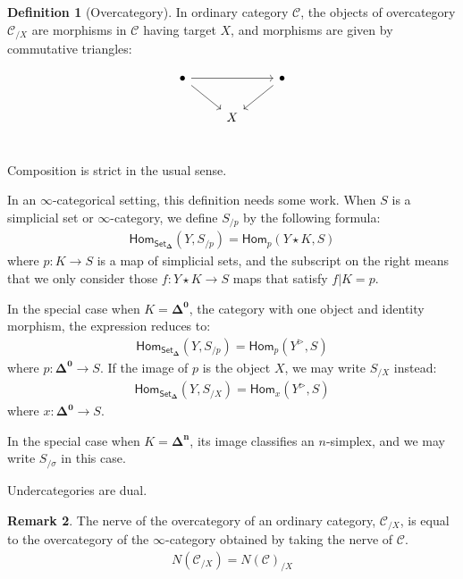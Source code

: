 \documentclass[10pt]{amsart}
\newcommand{\8}{\ensuremath{\infty}}
\newcommand{\0}{\ensuremath{\overset{\rightarrow}{0}}}
\newcommand{\1}{\ensuremath{\mathbf{1}}}
\newcommand{\C}{\ensuremath{\mathscr{C}}}
\newcommand{\Hom}{\ensuremath{\mathsf{Hom}}}
\newcommand{\Simplex}[1]{\ensuremath{\boldsymbol{\Delta^{#1}}}}
\newcommand{\SSet}{\ensuremath{\mathsf{Set}_{\boldsymbol{\Delta}}}}
\theoremstyle{definition}
\newtheorem{definition}{Definition}[section]
\newtheorem{remark}[definition]{Remark}
\numberwithin{definition}{subsection}
\numberwithin{definition}{section}
\begin{document}
\begin{definition}[Overcategory]
  In ordinary category \C, the objects of overcategory $\C_{/X}$ are morphisms in $\C$ having target $X$, and morphisms are given by commutative triangles:

  \begin{equation*}
    \begin{tikzcd}
      \bullet \arrow[rr] \arrow[dr] & & \bullet \arrow[dl] \\
      & X & \\
    \end{tikzcd}
  \end{equation*}

  Composition is strict in the usual sense.

  In an \8-categorical setting, this definition needs some work. When $S$ is a simplicial set or \8-category, we define $S_{/p}$ by the following formula:
  \begin{align*}
    \Hom_{\SSet}(Y, S_{/p}) = \Hom_p(Y \star K, S)
  \end{align*}
  where $p : K \rightarrow S$ is a map of simplicial sets, and the subscript on the right means that we only consider those $f : Y \star K \rightarrow S$ maps that satisfy $f|K = p$.

  In the special case when $K = \Simplex{0}$, the category with one object and identity morphism, the expression reduces to:
  \begin{align*}
    \Hom_{\SSet}(Y, S_{/p}) = \Hom_p(Y^\triangleright, S)
  \end{align*}
  where $p : \Simplex{0} \rightarrow S$. If the image of $p$ is the object $X$, we may write $S_{/X}$ instead:
  \begin{align*}
    \Hom_{\SSet}(Y, S_{/X}) = \Hom_x(Y^\triangleright, S)
  \end{align*}
  where $x : \Simplex{0} \rightarrow S$.

  In the special case when $K = \Simplex{n}$, its image classifies an $n$-simplex, and we may write $S_{/\sigma}$ in this case.

  Undercategories are dual.
\end{definition}

\begin{remark}
  The nerve of the overcategory of an ordinary category, $\C_{/X}$, is equal to the overcategory of the \8-category obtained by taking the nerve of $\C$.
  \begin{align*}
    N(\C_{/X}) = N(\C)_{/X}
  \end{align*}
\end{remark}
\end{document}
